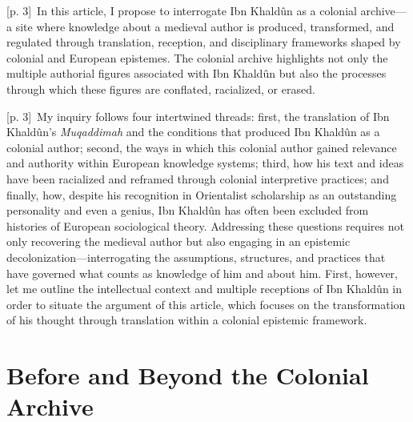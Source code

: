 \documentclass[10pt,a4paper]{article}
\begin{document}
{\scriptsize\color{gray} [p. 3]}\ In this article, I propose to interrogate Ibn Khaldûn as a colonial archive—a site where knowledge about a medieval author is produced, transformed, and regulated through translation, reception, and disciplinary frameworks shaped by colonial and European epistemes. The colonial archive highlights not only the multiple authorial figures associated with Ibn Khaldûn but also the processes through which these figures are conflated, racialized, or erased.\par
{\scriptsize\color{gray} [p. 3]}\ My inquiry follows four intertwined threads: first, the translation of Ibn Khaldûn’s \textit{Muqaddimah} and the conditions that produced Ibn Khaldûn as a colonial author; second, the ways in which this colonial author gained relevance and authority within European knowledge systems; third, how his text and ideas have been racialized and reframed through colonial interpretive practices; and finally, how, despite his recognition in Orientalist scholarship as an outstanding personality and even a genius, Ibn Khaldûn has often been excluded from histories of European sociological theory. Addressing these questions requires not only recovering the medieval author but also engaging in an epistemic decolonization—interrogating the assumptions, structures, and practices that have governed what counts as knowledge of him and about him. First, however, let me outline the intellectual context and multiple receptions of Ibn Khaldûn in order to situate the argument of this article, which focuses on the transformation of his thought through translation within a colonial epistemic framework.\par
{}\section*{Before and Beyond the Colonial Archive}
\end{document}

